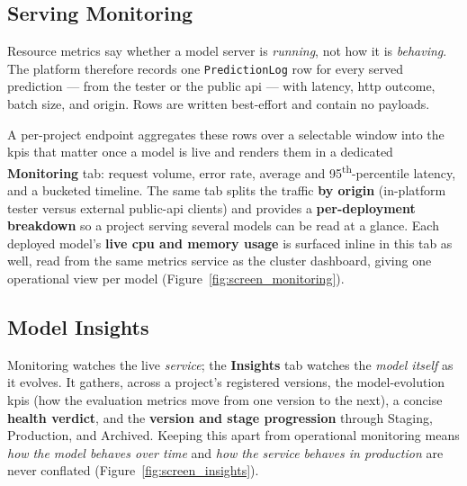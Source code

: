 
\subsection{Serving Monitoring}
\label{sec:serving-telemetry}
Resource metrics say whether a model server is \emph{running}, not how it is
\emph{behaving}. The platform therefore records one \texttt{PredictionLog} row
for every served prediction --- from the tester or the public \gls{api} ---
with latency, \gls{http} outcome, batch size, and origin. Rows are written
best-effort and contain no payloads.

A per-project endpoint aggregates these rows over a selectable window into the
\glspl{kpi} that matter once a model is live and renders them in a dedicated
\textbf{Monitoring} tab: request volume, error rate, average and
95\textsuperscript{th}-percentile latency, and a bucketed timeline. The same
tab splits the traffic \textbf{by origin} (in-platform tester versus external
public-\gls{api} clients) and provides a \textbf{per-deployment breakdown} so a
project serving several models can be read at a glance. Each deployed model's
\textbf{live \gls{cpu} and memory usage} is surfaced inline in this tab as well,
read from the same metrics service as the cluster dashboard, giving one
operational view per model (Figure~\ref{fig:screen_monitoring}).


\subsection{Model Insights}
\label{sec:insights}
Monitoring watches the live \emph{service}; the \textbf{Insights} tab watches the
\emph{model itself} as it evolves. It gathers, across a project's registered
versions, the model-evolution \glspl{kpi} (how the evaluation metrics move from
one version to the next), a concise \textbf{health verdict}, and the
\textbf{version and stage progression} through Staging, Production, and Archived.
Keeping this apart from operational monitoring means \emph{how the model behaves
over time} and \emph{how the service behaves in production} are never conflated
(Figure~\ref{fig:screen_insights}).

